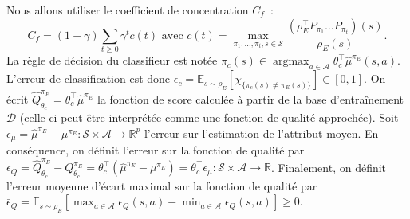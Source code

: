 \documentclass[french,utf8]{./hermes-journal}
\newcommand{\argmax}{\operatorname*{argmax}} %
\newcommand{\s}{\mathcal{S}}
\newcommand{\A}{\mathcal{A}}
\newcommand{\D}{\mathcal{D}}
\newcommand{\E}{\mathbb{E}}
\begin{document}
Nous allons utiliser le coefficient de concentration $C_f$~\cite{Muno007}:
\begin{equation}
  C_f = (1-\gamma)\sum_{t\geq 0} \gamma^t c(t) \text{ avec } c(t) =
  \max_{\pi_1,\dots,\pi_t,s\in\s}\frac{(\rho_E^\top P_{\pi_1}\dots
  P_{\pi_t})(s)}{\rho_E(s)}.
\end{equation}
La règle de décision du classifieur est notée $\pi_c(s) \in
\argmax_{a\in \A} \theta_c^\top\hat{\mu}^{\pi_E}(s,a)$. L'erreur de classification est donc $\epsilon_c =
\E_{s\sim\rho_E}[\chi_{\{\pi_c(s)\neq\pi_E(s)\}}] \in [0,1]$. On écrit $\hat{Q}^{\pi_E}_{\theta_c} = \theta_c^\top \hat{\mu}^{\pi_E}$ la fonction de score calculée à partir de la base d'entraînement $\D$ (celle-ci peut être interprétée comme une fonction de qualité approchée). Soit 
$\epsilon_{\mu} = \hat{\mu}^{\pi_E} - \mu^{\pi_E}:\s\times\A
\rightarrow  \mathbb{R}^p$ l'erreur sur l'estimation de l'attribut moyen.
En conséquence, on définit l'erreur sur la fonction de qualité par 
$\epsilon_Q = \hat{Q}^{\pi_E}_{\theta_c} - Q^{\pi_E}_{\theta_c} =
\theta_c^\top(\hat{\mu}^{\pi_E} - \mu^{\pi_E}) = \theta_c^\top
\epsilon_\mu:\s\times\A\rightarrow\mathbb{R}$. Finalement, on définit l'erreur moyenne d'écart maximal sur la fonction de qualité par $\bar{\epsilon}_Q =
\E_{s\sim\rho_E}[\max_{a\in\A}\epsilon_Q(s,a) -
\min_{a\in\A}\epsilon_Q(s,a)]\geq 0$.
\end{document}
